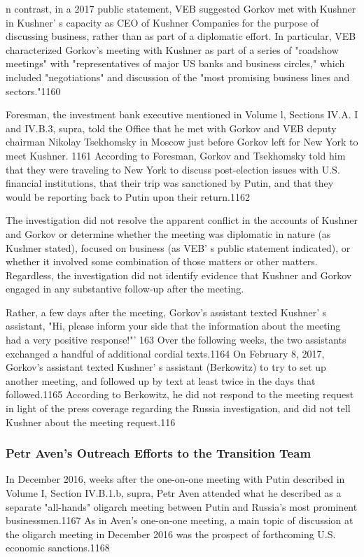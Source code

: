 n contrast, in a  2017 public statement, VEB suggested Gorkov met with Kushner in Kushner' s capacity as CEO of Kushner Companies for the purpose of discussing business, rather than as part of a  diplomatic effort. In particular, VEB characterized Gorkov's meeting with Kushner as part of a series of "roadshow meetings" with "representatives of major US banks and business circles," which included "negotiations"  and discussion of the "most promising business lines and sectors."1160

Foresman, the investment bank executive mentioned in Volume l,  Sections IV.A. I  and IV.B.3, supra, told the Office that he met with Gorkov and VEB deputy chairman Nikolay Tsekhomsky in Moscow just before Gorkov left for New York to meet Kushner. 1161 According to Foresman, Gorkov and Tsekhomsky told him that they were traveling to New York to discuss post-election issues with U.S. financial institutions, that their trip was sanctioned by Putin, and that they would be reporting back to Putin upon their return.1162

The investigation did not resolve the apparent conflict in the accounts of Kushner and Gorkov or determine whether the meeting was diplomatic in nature (as Kushner stated), focused on business (as VEB' s  public statement indicated), or whether it  involved some combination of those matters or other matters. Regardless, the investigation did not identify evidence that Kushner and Gorkov engaged in any substantive follow-up after the meeting.

Rather, a  few days after the meeting, Gorkov's assistant texted Kushner' s  assistant, "Hi, please inform your side that the information about the meeting had a very positive response!"' 163 Over the following weeks, the two assistants exchanged a handful of additional cordial texts.1164 On February 8, 2017, Gorkov's assistant texted Kushner' s  assistant (Berkowitz) to try to set up another meeting, and followed up by text at least twice in the days that followed.1165 According to Berkowitz, he did not respond to the meeting request in light of the press coverage regarding the Russia investigation, and did not tell Kushner about the meeting request.116

\subsubsection{Petr Aven's Outreach Efforts to the Transition Team}

In December 2016, weeks after the one-on-one meeting with Putin described in Volume I, Section IV.B.1.b, supra, Petr Aven attended what he described as a  separate "all-hands"  oligarch meeting between Putin and Russia's most prominent businessmen.1167 As in Aven's one-on-one meeting, a main topic of discussion at the oligarch meeting in December 2016 was the prospect of forthcoming U.S. economic sanctions.1168

